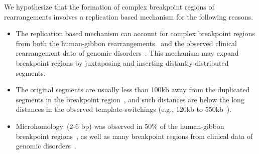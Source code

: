 \documentclass[12pt]{article}
\begin{document}
We hypothesize that the formation of complex breakpoint regions of rearrangements involves a replication based mechanism for the following reasons.
\begin{itemize}
\item The replication based mechanism can account for complex breakpoint regions from both the human-gibbon rearrangements~\cite{girirajan2009} 
and the observed clinical rearrangement data of genomic disorders~\cite{lee2007dna,liu2011chromosome}. 
This mechanism may expand breakpoint regions by juxtaposing and inserting distantly distributed segments.
\item The original segments are usually less than 100kb away from the duplicated segments in the breakpoint region~\cite{girirajan2009}, 
and such distances are below the long distances in the observed template-switchings (e.g., 120kb to 550kb~\cite{gu2008mechanisms}).
\item Microhomology~(2-6 bp) was observed in 50\% of the human-gibbon breakpoint regions~\cite{girirajan2009}, 
as well as many breakpoint regions from clinical data of genomic disorders~\cite{lee2007dna,liu2011chromosome}.  
\end{itemize}
\end{document}
